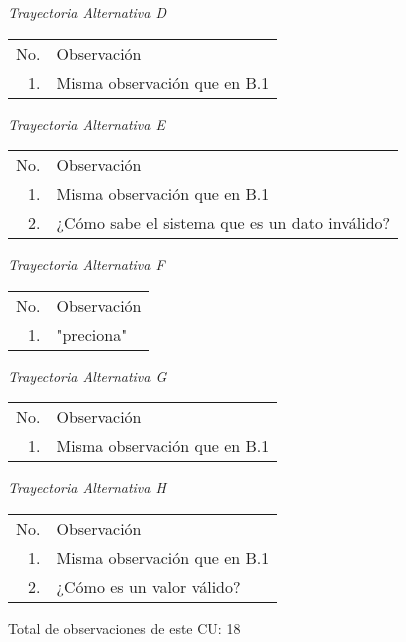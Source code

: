 \documentclass[10pt,spanish]{article}
\providecommand{\tabularnewline}{\\}
\begin{document}
\textit{Trayectoria Alternativa D}

\begin{longtable}{rp{8cm}}
No.  & Observación\tabularnewline
1. & Misma observación que en B.1\tabularnewline
\end{longtable}

\textit{Trayectoria Alternativa E}

\begin{longtable}{rp{8cm}}
No.  & Observación\tabularnewline
1. & Misma observación que en B.1\tabularnewline
2. & ¿Cómo sabe el sistema que es un dato inválido?\tabularnewline
\end{longtable}

\textit{Trayectoria Alternativa F}

\begin{longtable}{rp{8cm}}
No.  & Observación\tabularnewline
1. & "preciona"\tabularnewline
\end{longtable}

\textit{Trayectoria Alternativa G}

\begin{longtable}{rp{8cm}}
No.  & Observación\tabularnewline
1. & Misma observación que en B.1\tabularnewline
\end{longtable}

\textit{Trayectoria Alternativa H}

\begin{longtable}{rp{8cm}}
No.  & Observación\tabularnewline
1. & Misma observación que en B.1\tabularnewline
2. & ¿Cómo es un valor válido? \tabularnewline
\end{longtable}


Total de observaciones de este CU: 18
\newpage{} 
\end{document}
